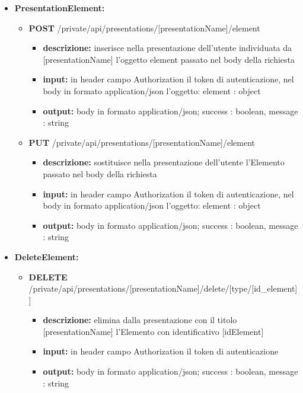{{\begin{itemize}
		\item \textbf{PresentationElement:}
			\begin{itemize}
			\item   \textbf{POST} /private/api/presentations/[presentationName]/element
				\begin{itemize} 
				\item \textbf{descrizione:} inserisce nella presentazione dell'utente individuata da [presentationName] l'oggetto element passato nel body della richiesta
				\item \textbf{input:} in header campo Authorization il token di autenticazione, nel body in formato application/json l'oggetto: element : object
				\item \textbf{output:} body in formato application/json; success : boolean, message : string
				\end{itemize}
				
			\item  \textbf{PUT} /private/api/presentations/[presentationName]/element
				\begin{itemize} 
				\item \textbf{descrizione:} sostituisce nella presentazione dell'utente l'Elemento passato nel body della richiesta
				\item \textbf{input:} in header campo Authorization il token di autenticazione, nel body in formato application/json l'oggetto: element : object
				\item \textbf{output:} body in formato application/json; success : boolean, message : string
				\end{itemize}
			\end{itemize}
				
		\item \textbf{DeleteElement:}
			\begin{itemize}
			\item   \textbf{DELETE} /private/api/presentations/[presentationName]/delete/[type/[id\_element]]
				\begin{itemize} 
				\item \textbf{descrizione:} elimina dalla presentazione con il titolo [presentationName] l'Elemento con identificativo [idElement]						
				\item \textbf{input:} in header campo Authorization il token di autenticazione
				\item \textbf{output:} body in formato application/json; success : boolean, message : string
				\end{itemize}
			\end{itemize}
			

\end{itemize}}}
